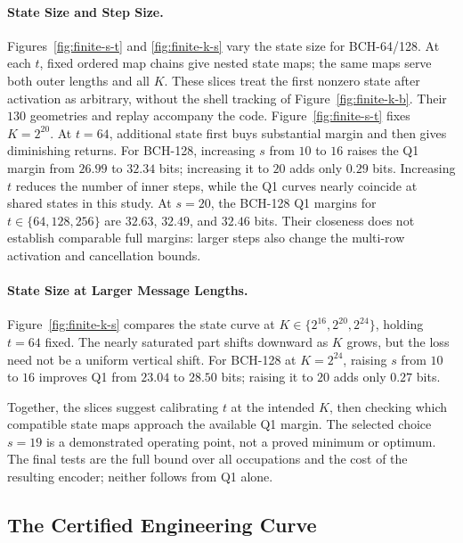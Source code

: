 \paragraph{State Size and Step Size.}
Figures~\ref{fig:finite-s-t} and \ref{fig:finite-k-s} vary the state size
for BCH-64/128. At each $t$, fixed ordered map chains give nested
state maps; the same maps serve both outer lengths and all $K$.
These slices treat the first nonzero state after activation as arbitrary,
without the shell tracking of Figure~\ref{fig:finite-k-b}. Their $130$
geometries and replay accompany the code\repositorycite.
Figure~\ref{fig:finite-s-t} fixes $K=2^{20}$. At $t=64$, additional state
first buys substantial margin and then gives diminishing returns.
For BCH-128, increasing $s$ from $10$ to $16$ raises the Q1 margin
from $26.99$ to $32.34$ bits; increasing it to $20$ adds only $0.29$ bits.
Increasing $t$ reduces the number of inner steps, while the Q1 curves
nearly coincide at shared states in this study. At $s=20$, the BCH-128 Q1 margins for
$t\in\{64,128,256\}$ are $32.63$, $32.49$, and $32.46$ bits.
Their closeness does not establish comparable full margins: larger steps
also change the multi-row activation and cancellation bounds.



\paragraph{State Size at Larger Message Lengths.}
Figure~\ref{fig:finite-k-s} compares the state curve at
$K\in\{2^{16},2^{20},2^{24}\}$, holding $t=64$ fixed.
The nearly saturated part shifts downward as $K$ grows, but the loss need
not be a uniform vertical shift. For BCH-128 at $K=2^{24}$, raising $s$
from $10$ to $16$ improves Q1 from $23.04$ to $28.50$ bits; raising it to
$20$ adds only $0.27$ bits.



Together, the slices suggest calibrating $t$ at the intended $K$, then
checking which compatible state maps approach the available Q1 margin.
The selected choice $s=19$ is a demonstrated operating point, not a proved
minimum or optimum. The final tests are the full bound over all occupations
and the cost of the resulting encoder; neither follows from Q1 alone.
\FloatBarrier

\subsection{The Certified Engineering Curve}
\label{sec:finite-engineering-curve}

